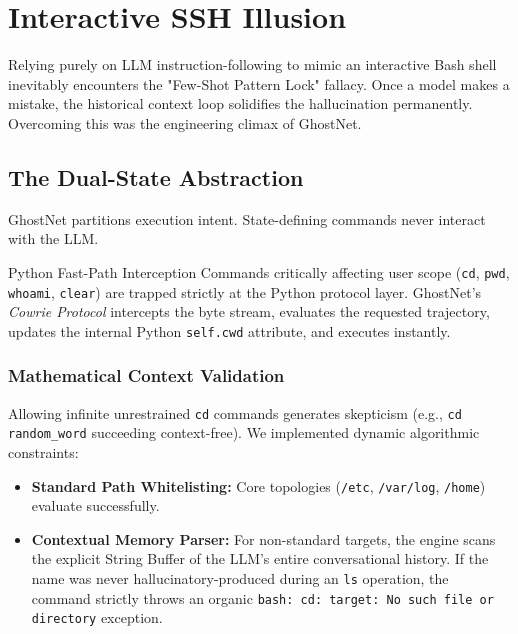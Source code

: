 \documentclass[11pt,a4paper]{report}
\begin{document}
\chapter{Interactive SSH Illusion}
Relying purely on LLM instruction-following to mimic an interactive Bash shell inevitably encounters the "Few-Shot Pattern Lock" fallacy. Once a model makes a mistake, the historical context loop solidifies the hallucination permanently. Overcoming this was the engineering climax of GhostNet.

\section{The Dual-State Abstraction}
GhostNet partitions execution intent. State-defining commands never interact with the LLM. 

\begin{threatalert}{Python Fast-Path Interception}
Commands critically affecting user scope (\texttt{cd}, \texttt{pwd}, \texttt{whoami}, \texttt{clear}) are trapped strictly at the Python protocol layer. GhostNet's \textit{Cowrie Protocol} intercepts the byte stream, evaluates the requested trajectory, updates the internal Python \texttt{self.cwd} attribute, and executes instantly.
\end{threatalert}

\subsection{Mathematical Context Validation}
Allowing infinite unrestrained \texttt{cd} commands generates skepticism (e.g., \texttt{cd random\_word} succeeding context-free). We implemented dynamic algorithmic constraints:
\begin{itemize}
    \item \textbf{Standard Path Whitelisting:} Core topologies (\texttt{/etc}, \texttt{/var/log}, \texttt{/home}) evaluate successfully.
    \item \textbf{Contextual Memory Parser:} For non-standard targets, the engine scans the explicit String Buffer of the LLM's entire conversational history. If the name was never hallucinatory-produced during an \texttt{ls} operation, the command strictly throws an organic \texttt{bash: cd: target: No such file or directory} exception.
\end{itemize}
\end{document}
